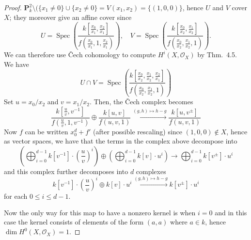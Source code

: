 \documentclass[10pt]{article}
\theoremstyle{definition}
\theoremstyle{remark}
\numberwithin{equation}{section}
\numberwithin{figure}{subsubsection}
\DeclareMathOperator{\Spec}{Spec}
\newcommand{\OO}{\mathcal{O}}
\begin{document}
\begin{proof}
  $\mathbf{P}^2_k \setminus (\{x_1 \ne 0\} \cup \{x_2 \ne 0\} = V(x_1,x_2) =
  \{(1,0,0)\}$, hence $U$ and $V$ cover $X$; they moreover give an affine cover
  since
  \begin{equation*}
    U = \Spec\!\left(\frac{\displaystyle k\!\left[ \frac{x_0}{x_1},\frac{x_2}{x_1}
    \right]}{\displaystyle f\!\left(
    \frac{x_0}{x_1},1,\frac{x_2}{x_1} \right)}\right), \quad
    V = \Spec\!\left(\frac{\displaystyle k\!\left[ \frac{x_0}{x_2},\frac{x_1}{x_2}
    \right]}{\displaystyle f\!\left(
    \frac{x_0}{x_2},\frac{x_1}{x_2},1 \right)}\right).
  \end{equation*}
  We can therefore use \v{C}ech cohomology to compute $H^i(X,\OO_X)$ by Thm.\
  4.5. We have
  \begin{equation*}
    U \cap V =
    \Spec\!\left(\frac{\displaystyle k\!\left[ \frac{x_0}{x_2},\frac{x_1}{x_2},
    \frac{x_2}{x_1}\right]}{\displaystyle f\!\left(
    \frac{x_0}{x_2},\frac{x_1}{x_2},1 \right)}\right)
  \end{equation*}
  Set $u = x_0/x_2$ and $v = x_1/x_2$. Then, the \v{C}ech complex becomes
  \begin{equation*}
    \frac{\displaystyle k\!\left[ \frac{u}{v},v^{-1} \right]}{\displaystyle
    f\!\left( \frac{u}{v},1,v^{-1} \right)} \oplus
    \frac{\displaystyle k\!\left[ u,v \right]}{\displaystyle f\!\left(
    u,v,1 \right)} \xrightarrow{(g,h) \mapsto h-g} \frac{k[u,v^{\pm}]}{f(u,v,1)}
  \end{equation*}
  Now $f$ can be written $x_0^d + f'$ (after possible rescaling) since $(1,0,0)
  \notin X$, hence as vector spaces, we have that the terms in the complex above
  decompose into
  \begin{equation*}
    \left(\bigoplus_{i=0}^{d-1} k[v^{-1}] \cdot \left(\frac{u}{v}\right)^{i}
    \right) \oplus
    \left(\bigoplus_{i=0}^{d-1} k[v] \cdot u^{i} \right) \longrightarrow
    \bigoplus_{i=0}^{d-1} k[v^\pm] \cdot u^i
  \end{equation*}
  and this complex further decomposes into $d$ complexes
  \begin{equation*}
    k[v^{-1}] \cdot \left(\frac{u}{v}\right)^{i} \oplus k[v] \cdot u^{i}
    \xrightarrow{(g,h) \mapsto h-g}  k[v^\pm] \cdot u^i
  \end{equation*}
  for each $0 \le i \le d-1$.
  \par Now the only way for this map to have a nonzero
  kernel is when $i=0$ and in this case the kernel consists of elements of the
  form $(a,a)$ where $a \in k$, hence $\dim H^0(X,\OO_X) = 1$.

\end{proof}
\end{document}
